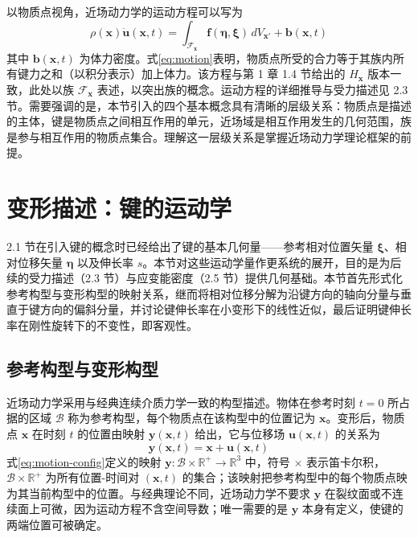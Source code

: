 以物质点视角，近场动力学的运动方程可以写为
\begin{equation}
  \rho(\mathbf{x})\ddot{\mathbf{u}}(\mathbf{x},t)=\int_{\mathcal{F}_{\mathbf{x}}}\mathbf{f}(\boldsymbol{\eta},\boldsymbol{\xi})\,dV_{\mathbf{x}'}+\mathbf{b}(\mathbf{x},t)
  \label{eq:motion}
\end{equation}
其中 $\mathbf{b}(\mathbf{x},t)$ 为体力密度。式\eqref{eq:motion}表明，物质点所受的合力等于其族内所有键力之和（以积分表示）加上体力。该方程与第 1 章 1.4 节给出的 $H_{\mathbf{x}}$ 版本一致，此处以族 $\mathcal{F}_{\mathbf{x}}$ 表述，以突出族的概念。运动方程的详细推导与受力描述见 2.3 节。需要强调的是，本节引入的四个基本概念具有清晰的层级关系：物质点是描述的主体，键是物质点之间相互作用的单元，近场域是相互作用发生的几何范围，族是参与相互作用的物质点集合。理解这一层级关系是掌握近场动力学理论框架的前提。

\section{变形描述：键的运动学}

2.1 节在引入键的概念时已经给出了键的基本几何量——参考相对位置矢量 $\boldsymbol{\xi}$、相对位移矢量 $\boldsymbol{\eta}$ 以及伸长率 $s$。本节对这些运动学量作更系统的展开，目的是为后续的受力描述（2.3 节）与应变能密度（2.5 节）提供几何基础。本节首先形式化参考构型与变形构型的映射关系，继而将相对位移分解为沿键方向的轴向分量与垂直于键方向的偏斜分量，并讨论键伸长率在小变形下的线性近似，最后证明键伸长率在刚性旋转下的不变性，即客观性。

\subsection{参考构型与变形构型}

近场动力学采用与经典连续介质力学一致的构型描述。物体在参考时刻 $t=0$ 所占据的区域 $\mathcal{B}$ 称为参考构型，每个物质点在该构型中的位置记为 $\mathbf{x}$。变形后，物质点 $\mathbf{x}$ 在时刻 $t$ 的位置由映射 $\mathbf{y}(\mathbf{x},t)$ 给出，它与位移场 $\mathbf{u}(\mathbf{x},t)$ 的关系为
\begin{equation}
  \mathbf{y}(\mathbf{x},t)=\mathbf{x}+\mathbf{u}(\mathbf{x},t)
  \label{eq:motion-config}
\end{equation}
式\eqref{eq:motion-config}定义的映射 $\mathbf{y}:\mathcal{B}\times\mathbb{R}^{+}\to\mathbb{R}^{3}$ 中，符号 $\times$ 表示笛卡尔积，$\mathcal{B}\times\mathbb{R}^{+}$ 为所有位置-时间对 $(\mathbf{x},t)$ 的集合；该映射把参考构型中的每个物质点映为其当前构型中的位置。与经典理论不同，近场动力学不要求 $\mathbf{y}$ 在裂纹面或不连续面上可微，因为运动方程不含空间导数；唯一需要的是 $\mathbf{y}$ 本身有定义，使键的两端位置可被确定。

